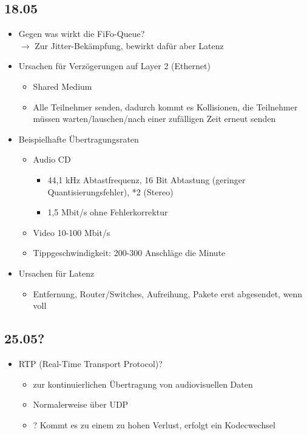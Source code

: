 \documentclass{article} %
\begin{document}
	\subsection{18.05}
	\begin{itemize}
		\item Gegen was wirkt die FiFo-Queue?\\
		$\rightarrow$ Zur Jitter-Bekämpfung, bewirkt dafür aber Latenz
		\item Ursachen für Verzögerungen auf Layer 2 (Ethernet)
		\begin{itemize}
			\item Shared Medium
			\item Alle Teilnehmer senden, dadurch kommt es Kollisionen, die Teilnehmer müssen warten/lauschen/nach einer zufälligen Zeit erneut senden
		\end{itemize}
		\item Beispielhafte Übertragungsraten
		\begin{itemize}
			\item Audio CD
				\begin{itemize}
					\item 44,1 kHz Abtastfrequenz, 16 Bit Abtastung (geringer Quantisierungsfehler), *2 (Stereo)
					\item 1,5 Mbit/s ohne Fehlerkorrektur
				\end{itemize}
			\item Video 10-100 Mbit/s
			\item Tippgeschwindigkeit: 200-300 Anschläge die Minute
		\end{itemize}
		\item Ursachen für Latenz
		\begin{itemize}
			\item Entfernung, Router/Switches, Aufreihung, Pakete erst abgesendet, wenn voll
		\end{itemize}
	\end{itemize}
	\subsection{25.05?}
	\begin{itemize}
		\item RTP (Real-Time Transport Protocol)?
		\begin{itemize}
			\item zur kontinuierlichen Übertragung von audiovisuellen Daten
			\item Normalerweise über UDP
			\item ? Kommt es zu einem zu hohen Verlust, erfolgt ein Kodecwechsel
		\end{itemize}
	\end{itemize}
\end{document}

